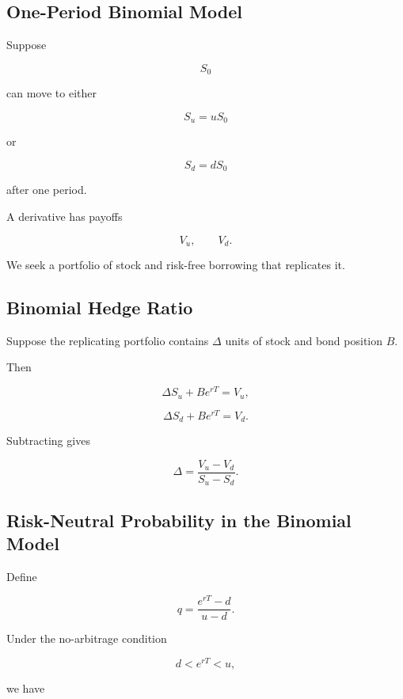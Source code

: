 \subsection{One-Period Binomial Model}
\label{subsec:one-period-binomial-model}

Suppose

\[
S_0
\]

can move to either

\[
\boxed{
S_u=uS_0
}
\]

or

\[
\boxed{
S_d=dS_0
}
\]

after one period.

A derivative has payoffs

\[
V_u,
\qquad
V_d.
\]

We seek a portfolio of stock and risk-free borrowing that replicates it.

\subsection{Binomial Hedge Ratio}
\label{subsec:binomial-hedge-ratio}

Suppose the replicating portfolio contains \(\Delta\) units of stock and bond
position \(B\).

Then

\[
\Delta S_u+Be^{rT}
=
V_u,
\]

\[
\Delta S_d+Be^{rT}
=
V_d.
\]

Subtracting gives

\[
\boxed{
\Delta
=
\frac{
V_u-V_d
}{
S_u-S_d
}.
}
\]

\subsection{Risk-Neutral Probability in the Binomial Model}
\label{subsec:binomial-risk-neutral-probability}

Define

\[
\boxed{
q
=
\frac{
e^{rT}-d
}{
u-d
}.
}
\]

Under the no-arbitrage condition

\[
\boxed{
d<e^{rT}<u,
}
\]

we have

